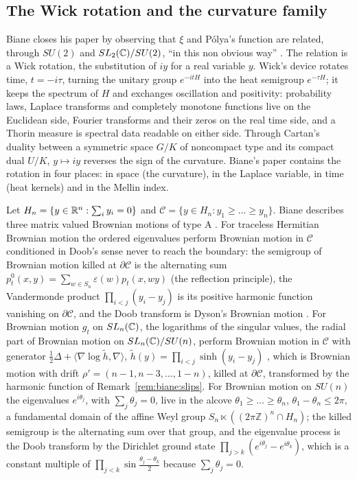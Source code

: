 \subsection{The Wick rotation and the curvature family}\label{sec:biane:wick}

Biane closes his paper by observing that $\xi$ and P\'olya's function are related, through $SU(2)$ and $SL_2(\mathbb{C})/SU(2)$, ``in this non obvious way'' \cite[Section 4.5]{Biane09}. The relation is a Wick rotation, the substitution of $iy$ for a real variable $y$. Wick's device \cite{Wick54} rotates time, $t=-i\tau$, turning the unitary group $e^{-itH}$ into the heat semigroup $e^{-\tau H}$; it keeps the spectrum of $H$ and exchanges oscillation and positivity: probability laws, Laplace transforms and completely monotone functions live on the Euclidean side, Fourier transforms and their zeros on the real time side, and a Thorin measure is spectral data readable on either side. Through Cartan's duality between a symmetric space $G/K$ of noncompact type and its compact dual $U/K$, $y\mapsto iy$ reverses the sign of the curvature. Biane's paper contains the rotation in four places: in space (the curvature), in the Laplace variable, in time (heat kernels) and in the Mellin index.

Let $H_n=\{y\in\mathbb{R}^n:\sum_iy_i=0\}$ and $\mathcal C=\{y\in H_n:y_1\ge\dots\ge y_n\}$. Biane describes three matrix valued Brownian motions of type A \cite[Section 2]{Biane09}. For traceless Hermitian Brownian motion the ordered eigenvalues perform Brownian motion in $\mathcal C$ conditioned in Doob's sense never to reach the boundary: the semigroup of Brownian motion killed at $\partial\mathcal C$ is the alternating sum $p^0_t(x,y)=\sum_{w\in S_n}\varepsilon(w)p_t(x,wy)$ (the reflection principle), the Vandermonde product $\prod_{i<j}(y_i-y_j)$ is its positive harmonic function vanishing on $\partial\mathcal C$, and the Doob transform is Dyson's Brownian motion \cite{Dyson62}. For Brownian motion $g_t$ on $SL_n(\mathbb{C})$, the logarithms of the singular values, the radial part of Brownian motion on $SL_n(\mathbb{C})/SU(n)$, perform Brownian motion in $\mathcal C$ with generator $\frac12\Delta+\langle\nabla\log\tilde h,\nabla\rangle$, $\tilde h(y)=\prod_{i<j}\sinh(y_i-y_j)$ \cite{JonesOConnell06}, which is Brownian motion with drift $\rho'=(n-1,n-3,\dots,1-n)$, killed at $\partial\mathcal C$, transformed by the harmonic function of Remark~\ref{rem:biane:slips}. For Brownian motion on $SU(n)$ the eigenvalues $e^{i\theta_j}$, with $\sum_j\theta_j=0$, live in the alcove $\theta_1\ge\dots\ge\theta_n$, $\theta_1-\theta_n\le2\pi$, a fundamental domain of the affine Weyl group $S_n\ltimes((2\pi\mathbb Z)^n\cap H_n)$; the killed semigroup is the alternating sum over that group, and the eigenvalue process is the Doob transform by the Dirichlet ground state $\prod_{j>k}(e^{i\theta_j}-e^{i\theta_k})$, which is a constant multiple of $\prod_{j<k}\sin\frac{\theta_j-\theta_k}2$ because $\sum_j\theta_j=0$.

